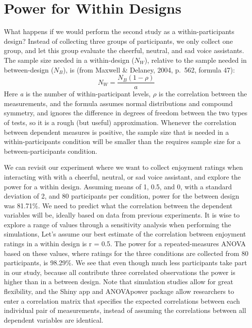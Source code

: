 \documentclass[,jou, draftfirst, a4paper,floatsintext]{apa6}
\begin{document}
\hypertarget{power-for-within-designs}{%
\section{Power for Within Designs}\label{power-for-within-designs}}

What happens if we would perform the second study as a within-participants design?
Instead of collecting three groups of participants, we only collect one group, and let this group evaluate the cheerful, neutral, and sad voice assistants.
The sample size needed in a within-design (\(N_W\)), relative to the sample needed in between-design (\(N_B\)), is (from Maxwell \& Delaney, 2004, p.~562, formula 47):
\begin{equation}
N_{W}=\frac{N_{B}(1-\rho)}{a} \label{eq:within-n}
\end{equation}
Here \emph{a} is the number of within-participant levels, \(\rho\) is the correlation between the measurements, and the formula assumes normal distributions and compound symmetry, and ignores the difference in degrees of freedom between the two types of tests, so it is a rough (but useful) approximation.
Whenever the correlation between dependent measures is positive, the sample size that is needed in a within-participants condition will be smaller than the requires sample size for a between-participants condition.

We can revisit our experiment where we want to collect enjoyment ratings when interacting with with a cheerful, neutral, or sad voice assistant, and explore the power for a within design.
Assuming means of 1, 0.5, and 0, with a standard deviation of 2, and 80 participants per condition, power for the between design was 81.71\%.
We need to predict what the correlation between the dependent variables will be, ideally based on data from previous experiments.
It is wise to explore a range of values through a sensitivity analysis when performing the simulations,
Let's assume our best estimate of the correlation between enjoyment ratings in a within design is r = 0.5.
The power for a repeated-measures ANOVA based on these values, where ratings for the three conditions are collected from 80 participants, is 98.29\%.
We see that even though much less participants take part in our study, because all contribute three correlated observations the power is higher than in a between design.
Note that simulation studies allow for great flexibility, and the Shiny app and ANOVApower package allow researchers to enter a correlation matrix that specifies the expected correlations between each individual pair of measurements, instead of assuming the correlations between all dependent variables are identical.
\end{document}
